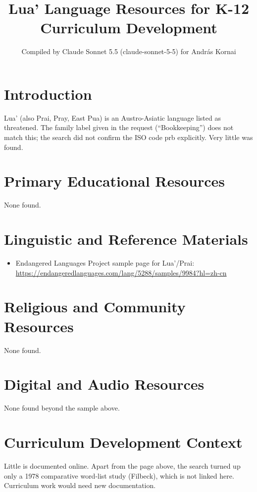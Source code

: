 \documentclass[12pt]{article}
\title{Lua' Language Resources for K-12 Curriculum Development}
\author{Compiled by Claude Sonnet 5.5 (claude-sonnet-5-5) for Andr\'as Kornai}
\date{}
\begin{document}
\maketitle
\section{Introduction}
Lua' (also Prai, Pray, East Pua) is an Austro-Asiatic language listed as threatened. The family label given in the request (``Bookkeeping'') does not match this; the search did not confirm the ISO code prb explicitly. Very little was found.
\section{Primary Educational Resources}
None found.
\section{Linguistic and Reference Materials}
\begin{itemize}
\item Endangered Languages Project sample page for Lua'/Prai: \url{https://endangeredlanguages.com/lang/5288/samples/9984?hl=zh-cn}
\end{itemize}
\section{Religious and Community Resources}
None found.
\section{Digital and Audio Resources}
None found beyond the sample above.
\section{Curriculum Development Context}
Little is documented online. Apart from the page above, the search turned up only a 1978 comparative word-list study (Filbeck), which is not linked here. Curriculum work would need new documentation.
\end{document}
